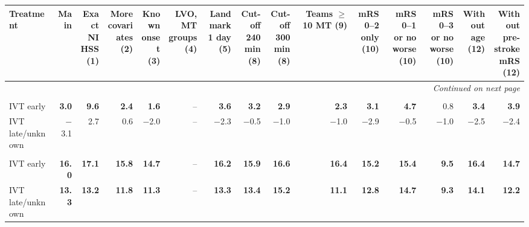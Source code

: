 \begin{landscape}
{\begin{longtable}{p{4.9cm}rrrrrrrrrrrrrr}
Treatment & Main & \makecell{Exact\\NIHSS\\(1)} & \makecell{More\\covariates\\(2)} & \makecell{Known\\onset\\(3)} & \makecell{LVO,\\MT groups\\(4)} & \makecell{Landmark\\1 day\\(5)} & \makecell{Cut-off\\240 min\\(8)} & \makecell{Cut-off\\300 min\\(8)} & \makecell{Teams\\$\ge$10 MT\\(9)} & \makecell{mRS 0--2\\only\\(10)} & \makecell{mRS 0--1\\or no worse\\(10)} & \makecell{mRS 0--3\\or no worse\\(10)} & \makecell{Without\\age\\(12)} & \makecell{Without\\pre-stroke\\mRS (12)} \\
\midrule
\endhead
\midrule
\multicolumn{15}{r}{\textit{Continued on next page}}\\
\endfoot
\bottomrule
\endlastfoot
\multicolumn{15}{l}{\textbf{NIHSS 1--5}}\\
IVT early & \textbf{3.0} & \textbf{9.6} & \textbf{2.4} & \textbf{1.6} & -- & \textbf{3.6} & \textbf{3.2} & \textbf{2.9} & \textbf{2.3} & \textbf{3.1} & \textbf{4.7} & 0.8 & \textbf{3.4} & \textbf{3.9} \\
IVT late/unknown & $-$3.1 & 2.7 & 0.6 & $-$2.0 & -- & $-$2.3 & $-$0.5 & $-$1.0 & $-$1.0 & $-$2.9 & $-$0.5 & $-$1.0 & $-$2.5 & $-$2.4 \\
\addlinespace
\multicolumn{15}{l}{\textbf{NIHSS 6--10}}\\
IVT early & \textbf{16.0} & \textbf{17.1} & \textbf{15.8} & \textbf{14.7} & -- & \textbf{16.2} & \textbf{15.9} & \textbf{16.6} & \textbf{16.4} & \textbf{15.2} & \textbf{15.4} & \textbf{9.5} & \textbf{16.4} & \textbf{14.7} \\
IVT late/unknown & \textbf{13.3} & \textbf{13.2} & \textbf{11.8} & \textbf{11.3} & -- & \textbf{13.3} & \textbf{13.4} & \textbf{15.2} & \textbf{11.1} & \textbf{12.8} & \textbf{14.7} & \textbf{9.3} & \textbf{14.1} & \textbf{12.2} \\

\end{longtable}}
\end{landscape}
